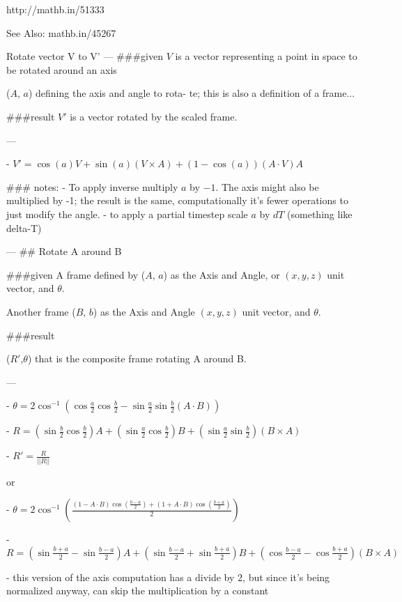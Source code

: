 http://mathb.in/51333

See Also:  mathb.in/45267

Rotate vector V to V'
---
###given
 $V$ is a vector representing a point in space to be rotated around an axis

($A$, $a$) defining the axis and angle to rota- te; this is also a definition of a frame...

###result
 $V'$ is a vector rotated by the scaled frame.
 


---

- $ V' =  \cos(a) V + \sin( a )( V \times A) + (1-\cos( a )) ( A \cdot V ) A $



### notes:
 - To apply inverse multiply $a$ by $-1$.  The axis might also be multiplied by -1; the result is the same, computationally it's fewer operations to just modify the angle.
 - to apply a partial timestep scale $a$ by $dT$ (something like delta-T)


---
## Rotate A around B

###given
A frame defined by ($A$, $a$) as the Axis and Angle, or  $(x,y,z)$ unit vector, and $\theta$. 

Another frame ($B$, $b$) as the Axis and Angle  $(x,y,z)$ unit vector, and $\theta$.

###result 

($R'$,$\theta$) that is the composite frame rotating A around B.

---

- $  \theta = 2 \cos^{-1} ( \cos\frac a 2\cos\frac b 2-\sin\frac a 2\sin\frac b 2 ( A \cdot B ) )  $
  
- $   R = (\sin\frac b 2\cos\frac b 2)A 
           + (\sin\frac a 2\cos\frac b 2)B 
           + (\sin\frac a 2\sin\frac b 2)( B \times A )$

- $  R' = \frac R {||R||} $  

or

- $\theta = 2 \cos^{-1} ( \frac { (1 - A \cdot B) \cos( \frac {b - a} 2) + (1 + A \cdot B) \cos(\frac {b + a} 2) } 2 ) $


      
- $  R = (\sin \frac {b + a} 2 - \sin \frac {b - a} 2) A 
           + ( \sin\frac {b - a} 2 + \sin\frac {b + a} 2) B 
           + ( \cos\frac {b - a} 2 - \cos\frac {b + a} 2)( B \times A )$

  - this version of the axis computation has a divide by $2$, but since it's being  normalized anyway, can skip the multiplication by a constant

